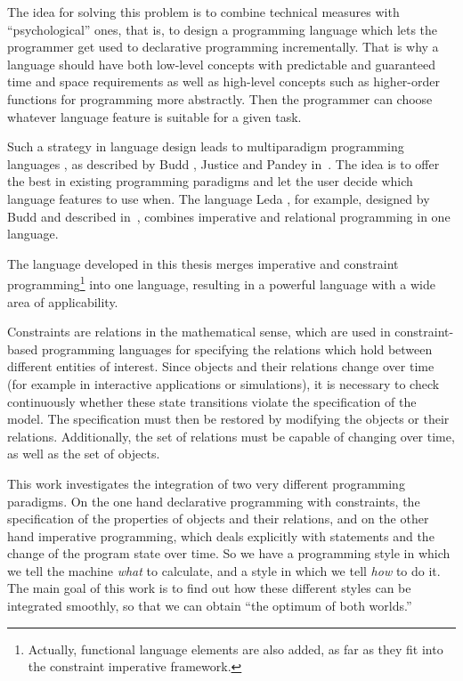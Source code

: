 \noindent
The idea for solving this problem is to combine technical measures
with ``psychological'' ones, that is, to design a programming language
which lets the programmer get used to declarative programming
incrementally.  That is why a language should have both low-level
concepts with predictable and guaranteed time and space requirements
as well as high-level concepts such as higher-order functions%
 for programming more abstractly. Then
the programmer can choose whatever language feature is suitable for a
given task.

Such a strategy in language design leads to multiparadigm programming
languages%
%
, as described by Budd%
, Justice%
 and Pandey%
 in~\cite{buddGeneral}.  The idea is to offer the best
in existing programming paradigms and let the user decide which
language features to use when.  The language Leda%
, for example, designed by Budd%
 and described in~\cite{budd94leda, budd95mppil}, combines
imperative and relational programming in one language.

The language \turtle{}%
 developed in this thesis merges imperative and
constraint programming\footnote{Actually, functional language elements
  are also added, as far as they fit into the constraint imperative
  framework.}  into one language, resulting in a powerful language
with a wide area of applicability.

Constraints are relations in the mathematical sense, which are used in
constraint-based programming languages for specifying the relations
which hold between different entities of interest.  Since objects and
their relations change over time (for example in interactive
applications or simulations), it is necessary to check continuously
whether these state transitions violate the specification of the
model.  The specification must then be restored by modifying the
objects or their relations.  Additionally, the set of relations must
be capable of changing over time, as well as the set of objects.

This work investigates the integration of two very different
programming paradigms.  On the one hand declarative programming with
constraints, the specification of the properties of objects and their
relations, and on the other hand imperative programming, which deals
explicitly with statements and the change of the program state over
time.  So we have a programming style in which we tell the machine
{\em what} to calculate, and a style in which we tell {\em how} to do
it.  The main goal of this work is to find out how these different
styles can be integrated smoothly, so that we can obtain ``the optimum
of both worlds.''


